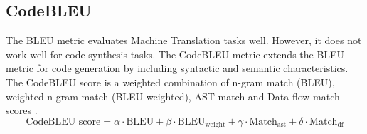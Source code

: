 \subsection{CodeBLEU} \label{codebleu}
The BLEU metric evaluates Machine Translation tasks well. However, it does not work well for code synthesis tasks. The CodeBLEU metric extends the BLEU metric for code generation by including syntactic and semantic characteristics. The CodeBLEU score is a weighted combination of n-gram match (BLEU), weighted n-gram match (BLEU-weighted), AST match and Data flow match scores \cite{ren2020codebleu}.
\begin{equation}
\text{CodeBLEU score} = \alpha \cdot \text{BLEU} + \beta \cdot \text{BLEU}_{\text{weight}} + \gamma \cdot \text{Match}_{\text{ast}} + \delta \cdot \text{Match}_{\text{df}}
\end{equation}

